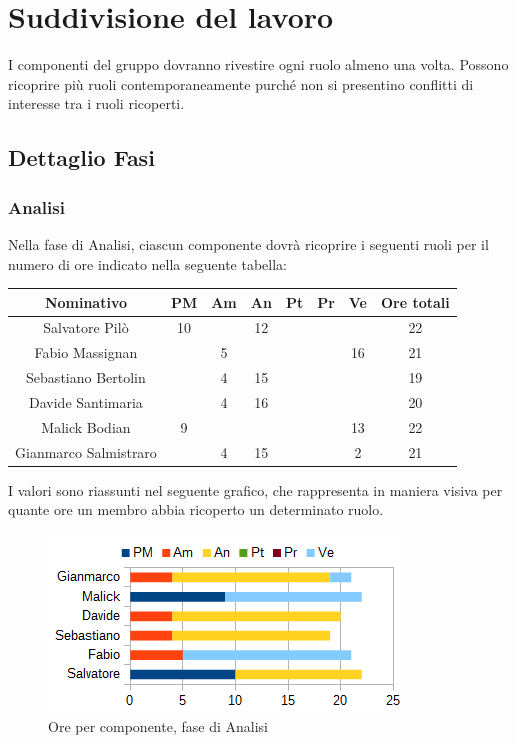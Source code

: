 \section{Suddivisione del lavoro}
I componenti del gruppo dovranno rivestire ogni ruolo almeno una volta. Possono ricoprire più ruoli contemporaneamente purché non si presentino conflitti di interesse tra i ruoli ricoperti.
	\subsection{Dettaglio Fasi}
		\subsubsection{Analisi}
		Nella fase di Analisi, ciascun componente dovrà ricoprire i seguenti ruoli per il numero di ore indicato nella seguente tabella: \\
		\begin{table}[H]
		\centering
		\begin{tabular}{|c|c|c|c|c|c|c|c|}
			\hline
			\textbf{Nominativo}		& \textbf{PM}	& \textbf{Am}	& \textbf{An}	& \textbf{Pt}	& \textbf{Pr}	& \textbf{Ve}	& \textbf{Ore totali}     \\
			\hline
			Salvatore Pilò			& 10	& 		& 12	&		&		&		& 22 \\
			Fabio Massignan			&		& 5		&		&		&		& 16	& 21 \\
			Sebastiano Bertolin		&		& 4		& 15	&		&		&		& 19 \\
			Davide Santimaria		&		& 4		& 16	&		&		&		& 20 \\
			Malick Bodian			& 9		&		&		&		&		& 13	& 22 \\
			Gianmarco Salmistraro	&		& 4		& 15	&		&		& 2		& 21 \\
			\hline
		\end{tabular}
		\end{table}
		I valori sono riassunti nel seguente grafico, che rappresenta in maniera visiva per quante ore un membro abbia ricoperto un determinato ruolo. \\
		\begin{figure}[H]
			\centering
			\includegraphics[scale=1]{immagini/grafici/analisi-barra.png}
			\caption{Ore per componente, fase di Analisi}
		\end{figure}
